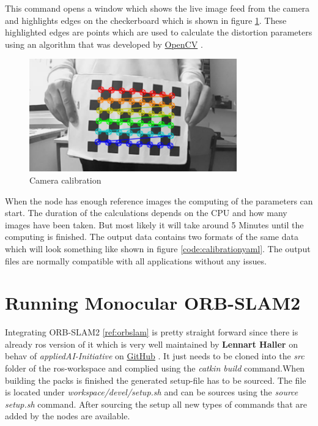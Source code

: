 This command opens a window which shows the live image feed from the camera and highlights edges on the checkerboard which is shown in figure \ref{img:cameracalibration}. These highlighted edges are points which are used to calculate the distortion parameters using an algorithm that was developed by \href{https://docs.opencv.org/2.4/doc/tutorials/calib3d/camera_calibration/camera_calibration.html}{OpenCV} \cite{cameracalibrationopencv}.
\begin{figure}[h]
	\centering
	\includegraphics[width=0.8\textwidth]{./media/images/CameraCalibration.png}
  	\caption{Camera calibration}
  	\label{img:cameracalibration}
\end{figure} \newline

When the node has enough reference images the computing of the parameters can start. The duration of the calculations depends on the CPU and how many images have been taken. But most likely it will take around 5 Minutes until the computing is finished. The output data contains two formats of the same data which will look something like shown in figure \ref{code:calibrationyaml}. The output files are normally compatible with all applications without any issues.\newline



\section{Running Monocular ORB-SLAM2\authorA}\label{ref:runningmonocularorbslam}
Integrating ORB-SLAM2 \ref{ref:orbslam} is pretty straight forward since there is already \gls{ros} version of it which is very well maintained by \textbf{Lennart Haller} on behav of \textit{appliedAI-Initiative} on \href{https://github.com/appliedAI-Initiative/orb_slam_2_ros}{GitHub} \cite{orbslam2rosgithub}. It just needs to be cloned into the \textit{src} folder of the \gls{ros}-workspace and complied using the \textit{catkin build} command.When building the packs is finished the generated setup-file has to be sourced. The file is located under \textit{workspace/devel/setup.sh} and can be sources using the \textit{source setup.sh} command. After sourcing the setup all new types of commands that are added by the nodes are available.

